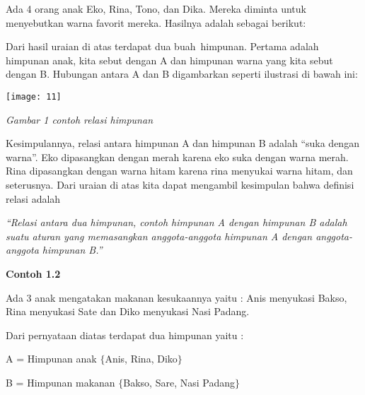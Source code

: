 \documentclass[11pt,fleqn]{book} %
\begin{document}
\noindent Ada 4 orang anak Eko, Rina, Tono, dan Dika. Mereka diminta untuk menyebutkan warna favorit mereka. Hasilnya adalah sebagai berikut:

\noindent 

\noindent 

\noindent 

\noindent 

\noindent 

\noindent 

\noindent Dari hasil uraian di atas terdapat dua buah~himpunan. Pertama adalah himpunan anak, kita sebut dengan A dan himpunan warna yang kita sebut dengan B. Hubungan antara A dan B digambarkan seperti ilustrasi di bawah ini:

\noindent 

\begin{center}
\noindent \texttt{[image: 11]}
\end{center}

\noindent \textit{Gambar 1 contoh relasi himpunan}

\noindent 

\noindent Kesimpulannya, relasi antara himpunan A dan himpunan B adalah ``suka dengan warna''. Eko dipasangkan dengan merah karena eko suka dengan warna merah. Rina dipasangkan dengan warna hitam karena rina menyukai warna hitam, dan seterusnya. Dari uraian di atas kita dapat mengambil kesimpulan bahwa definisi relasi adalah

\noindent 

\noindent \textit{``Relasi antara dua himpunan, contoh himpunan A dengan himpunan B adalah suatu aturan yang memasangkan anggota-anggota himpunan A dengan anggota-anggota himpunan B.''}

\noindent 

\noindent 

\noindent \textbf{Contoh 1.2}

\noindent Ada 3 anak mengatakan makanan kesukaannya yaitu : Anis menyukasi Bakso, Rina menyukasi Sate dan Diko menyukasi Nasi Padang.

\noindent 

\noindent Dari pernyataan diatas terdapat dua himpunan yaitu :

\noindent A = Himpunan anak $\{$Anis, Rina, Diko$\}$

\noindent B = Himpunan makanan $\{$Bakso, Sare, Nasi Padang$\}$

\noindent 
\end{document}
